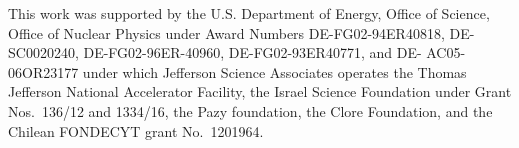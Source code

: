 \documentclass[3p,twocolumn]{elsarticle}
\begin{document}
This work was supported by the U.S. Department of Energy, Office of Science, Office of Nuclear Physics under Award Numbers DE-FG02-94ER40818, DE-SC0020240, DE-FG02-96ER-40960, DE-FG02-93ER40771, and DE- AC05-06OR23177 under which Jefferson Science Associates operates the Thomas Jefferson National Accelerator Facility, the Israel Science Foundation under Grant Nos.\ 136/12 and 1334/16, the Pazy foundation, the Clore Foundation, and the Chilean FONDECYT grant No.\ 1201964.





 


%
%
\end{document}
